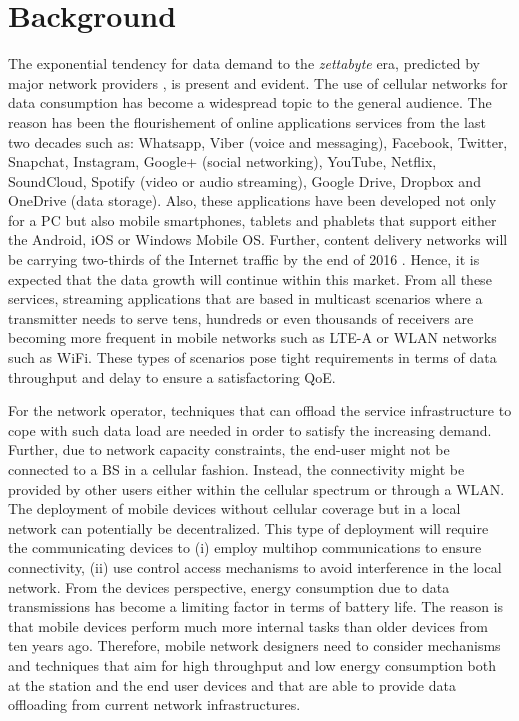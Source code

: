 \section{Background}\label{sec:background}
The exponential tendency for data demand to the \textit{zettabyte} era, predicted by major network providers \cite{cisco2016forecast,kremling2015presentation,belllabs2016report,ericsson2015report}, is present and evident. The use of cellular networks for data consumption has become a widespread topic to the general audience. The reason has been the flourishement of online applications services from the last two decades such as:  Whatsapp, Viber (voice and messaging), Facebook, Twitter, Snapchat, Instagram, Google+ (social networking), YouTube, Netflix, SoundCloud, Spotify (video or audio streaming), Google Drive, Dropbox and OneDrive (data storage). Also, these applications have been developed not only for a \ac{PC} but also mobile smartphones, tablets and phablets that support either the Android, iOS or Windows Mobile \ac{OS}. Further, content delivery networks will be carrying two-thirds of the Internet traffic by the end of 2016 \cite{cisco2016forecast}. Hence, it is expected that the data growth will continue within this market. From all these services, streaming applications that are based in multicast scenarios where a transmitter needs to serve tens, hundreds or even thousands of receivers are becoming more frequent in mobile networks such as \ac{LTE-A} or \ac{WLAN} networks such as \ac{WiFi}. These types of scenarios pose tight requirements in terms of data throughput and delay to ensure a satisfactoring \ac{QoE}.

For the network operator, techniques that can offload the service infrastructure to cope with such data load are needed in order to satisfy the increasing demand. Further, due to network capacity constraints, the end-user might not be connected to a \ac{BS} in a cellular fashion. Instead, the connectivity might be provided by other users either within the cellular spectrum or through a \ac{WLAN}. The deployment of mobile devices without cellular coverage but in a local network can potentially be decentralized. This type of deployment will require the communicating devices to (i) employ multihop communications to ensure connectivity, (ii) use control access mechanisms to avoid interference in the local network. From the devices perspective, energy consumption due to data transmissions has become a limiting factor in terms of battery life. The reason is that mobile devices perform much more internal tasks than older devices from ten years ago. Therefore, mobile network designers need to consider mechanisms and techniques that aim for high throughput and low energy consumption both at the station and the end user devices and that are able to provide data offloading from current network infrastructures.

